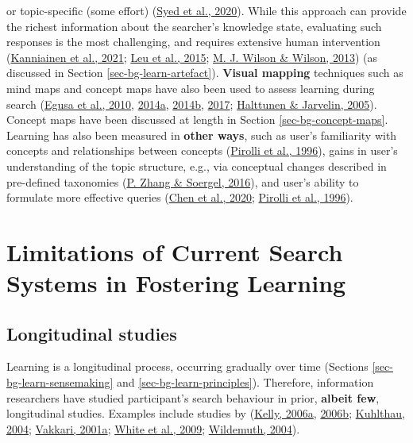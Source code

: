 \documentclass[letterpaper, nobind]{templates/ociamthesis}
\begin{document}
or topic-specific (some effort) (\protect\hyperlink{ref-syed2020improving}{Syed et al., 2020}). While this
approach can provide the richest information about the searcher's
knowledge state, evaluating such responses is the most challenging, and
requires extensive human intervention
(\protect\hyperlink{ref-kanniainen2021assessing}{Kanniainen et al., 2021}; \protect\hyperlink{ref-leu2015new}{Leu et al., 2015}; \protect\hyperlink{ref-wilson2013comparison}{M. J. Wilson \& Wilson, 2013}) (as
discussed in Section \ref{sec-bg-learn-artefact}). \textbf{Visual mapping} techniques such
as mind maps and concept maps have also been used to assess learning
during search
(\protect\hyperlink{ref-egusa2010usingb}{Egusa et al., 2010}, \protect\hyperlink{ref-egusa2014howd}{2014a}, \protect\hyperlink{ref-egusa2014howe}{2014b}, \protect\hyperlink{ref-egusa2017evaluating}{2017}; \protect\hyperlink{ref-halttunen2005assessing}{Halttunen \& Jarvelin, 2005}).
Concept maps have been discussed at length in Section \ref{sec-bg-concept-maps}. Learning has also been measured in
\textbf{other ways}, such as user's familiarity with concepts and
relationships between concepts (\protect\hyperlink{ref-pirolli1996scatter}{Pirolli et al., 1996}), gains in user's
understanding of the topic structure, e.g., via conceptual changes
described in pre-defined taxonomies (\protect\hyperlink{ref-zhang2016process}{P. Zhang \& Soergel, 2016}), and user's
ability to formulate more effective queries
(\protect\hyperlink{ref-chen2020understanding}{Chen et al., 2020}; \protect\hyperlink{ref-pirolli1996scatter}{Pirolli et al., 1996}).

\hypertarget{limitations-of-current-search-systems-in-fostering-learning}{%
\section{Limitations of Current Search Systems in Fostering Learning}\label{limitations-of-current-search-systems-in-fostering-learning}}

\hypertarget{sec-bg-search-longitudinal-studies}{%
\subsection{Longitudinal studies}\label{sec-bg-search-longitudinal-studies}}

Learning is a longitudinal process, occurring gradually over time
(Sections \ref{sec-bg-learn-sensemaking} and \ref{sec-bg-learn-principles}). Therefore, information
researchers have studied participant's search behaviour in prior,
\textbf{albeit few}, longitudinal studies. Examples include studies by
(\protect\hyperlink{ref-kelly2006measuring-a}{Kelly, 2006a}, \protect\hyperlink{ref-kelly2006measuring-b}{2006b}; \protect\hyperlink{ref-kuhlthau2004seeking}{Kuhlthau, 2004}; \protect\hyperlink{ref-vakkari2001changes}{Vakkari, 2001a}; \protect\hyperlink{ref-white2009characterizing}{White et al., 2009}; \protect\hyperlink{ref-wildemuth2004effects}{Wildemuth, 2004}).
\end{document}
